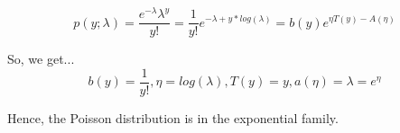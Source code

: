 \begin{answer}
	\begin{equation*}
	    p(y;\lambda) = \frac{e^{-\lambda}\lambda^{y}}{y!}
	    = \frac{1}{y!}e^{-\lambda+y*log(\lambda)}
	    =b(y)e^{\eta T(y)-A(\eta)}
	\end{equation*}
	
So, we get...
    \begin{equation*}
        b(y) = \frac{1}{y!},
        \eta = log(\lambda),
        T(y) = y,
        a(\eta) = \lambda = e^{\eta}
    \end{equation*}
    
    Hence, the Poisson distribution is in the exponential family.
    
\end{answer}
